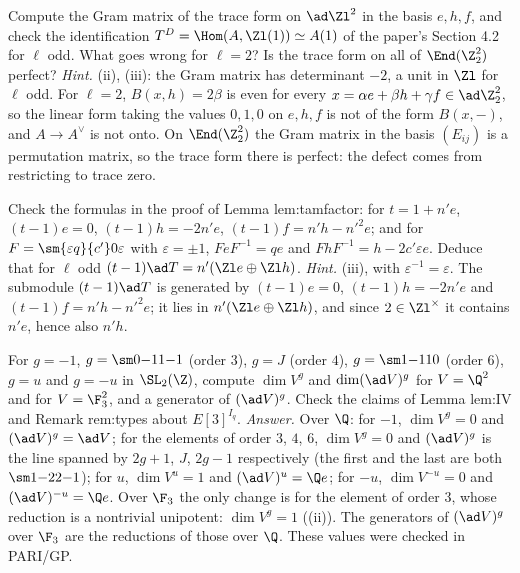 \begin{exercise}\label{ex:reps:ex11}
Compute the Gram matrix of the trace form on $\ad\Zl^2$ in the basis $e,h,f$, and check the identification $T^D=\Hom(A,\Zl(1))\simeq A(1)$ of the paper's
Section 4.2 for $\ell$ odd. What goes wrong for $\ell=2$? Is the trace form on all of $\End(\Z_2^2)$ perfect?
\emph{Hint.} (ii), (iii): the Gram matrix has determinant $-2$, a unit in $\Zl$ for $\ell$ odd. For $\ell=2$,
$B(x,h)=2\beta$ is even for every $x=\alpha e+\beta h+\gamma f\in\ad\Z_2^2$, so the linear form taking the values $0,1,0$ on $e,h,f$ is not of the form
$B(x,{-})$, and $A\to A^\vee$ is not onto. On $\End(\Z_2^2)$ the Gram matrix in the basis $(E_{ij})$ is a permutation matrix, so the trace form there
is perfect: the defect comes from restricting to trace zero.
\end{exercise}

\begin{exercise}\label{ex:reps:ex12}
Check the formulas in the proof of Lemma lem:tamfactor: for $t=1+n'e$, $(t-1)e=0$, $(t-1)h=-2n'e$, $(t-1)f=n'h-n'^2e$; and for
$F=\sm{\varepsilon q}{c'}0\varepsilon$ with $\varepsilon=\pm1$, $FeF^{-1}=qe$ and $FhF^{-1}=h-2c'\varepsilon e$. Deduce that for $\ell$ odd $(t-1)\ad T=n'(\Zl e\oplus\Zl h)$.
\emph{Hint.} (iii), with $\varepsilon^{-1}=\varepsilon$. The submodule $(t-1)\ad T$ is generated by $(t-1)e=0$, $(t-1)h=-2n'e$
and $(t-1)f=n'h-n'^2e$; it lies in $n'(\Zl e\oplus\Zl h)$, and since $2\in\Zl^\times$ it contains $n'e$, hence also $n'h$.
\end{exercise}

\begin{exercise}\label{ex:reps:ex13}
For $g=-1$, $g=\sm0{-1}1{-1}$ (order $3$), $g=J$ (order $4$), $g=\sm1{-1}10$ (order $6$), $g=u$ and $g=-u$ in $\SL_2(\Z)$, compute $\dim V^g$ and $\dim(\ad V)^g$ for
$V=\Q^2$ and for $V=\F_3^2$, and a generator of $(\ad V)^g$. Check the claims of Lemma lem:IV and Remark rem:types about $E[3]^{I_q}$.
\emph{Answer.} Over $\Q$: for $-1$, $\dim V^g=0$ and $(\ad V)^g=\ad V$; for the elements of order $3$, $4$, $6$, $\dim V^g=0$ and $(\ad V)^g$ is
the line spanned by $2g+1$, $J$, $2g-1$ respectively (the first and the last are both $\sm1{-2}2{-1}$); for $u$, $\dim V^u=1$ and
$(\ad V)^u=\Q e$; for $-u$, $\dim V^{-u}=0$ and $(\ad V)^{-u}=\Q e$. Over $\F_3$ the only change is for the element of order $3$, whose reduction is a
nontrivial unipotent: $\dim V^g=1$ ((ii)). The generators of $(\ad V)^g$ over $\F_3$ are the reductions of those
over $\Q$. These values were checked in PARI/GP.
\end{exercise}

